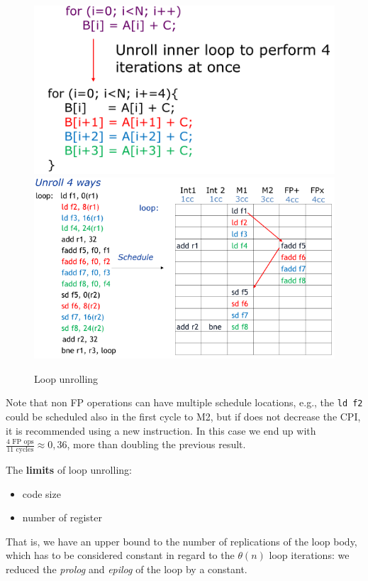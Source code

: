 \begin{figure}[h]
    \centering
    \includegraphics[scale = 0.4]{images/loop-unrolling-1}
    \includegraphics[scale = 0.4]{images/loop-unrolling-2}
    \caption{Loop unrolling}
    \label{fig:loop-unrolling}
\end{figure}

Note that non FP operations can have multiple schedule locations, e.g., the \verb|ld f2| could be scheduled also in
the first cycle to M2, but if does not decrease the CPI, it is recommended using a new instruction.
In this case we end up with \(\frac{4\text{ FP ops}}{11\text{ cycles}} \approx 0,36\), more than doubling the
previous result.

The \textbf{limits} of loop unrolling:
\begin{itemize}
    \item[] code size
    \item[] number of register
\end{itemize}
That is, we have an upper bound to the number of replications of the loop body, which has to be considered constant
in regard to the $\theta(n)$ loop iterations: we reduced the \textit{prolog} and \textit{epilog} of the loop by
a constant.

